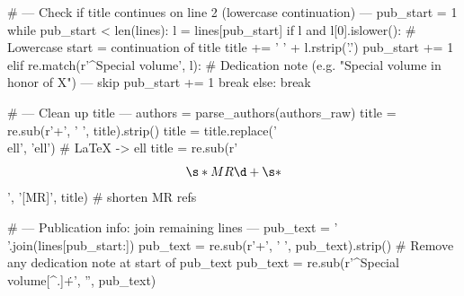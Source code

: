     # --- Check if title continues on line 2 (lowercase continuation) ---
    pub_start = 1
    while pub_start < len(lines):
        l = lines[pub_start]
        if l and l[0].islower():
            # Lowercase start = continuation of title
            title += ' ' + l.rstrip('.')
            pub_start += 1
        elif re.match(r'^Special volume', l):
            # Dedication note (e.g. "Special volume in honor of X") — skip
            pub_start += 1
            break
        else:
            break

    # --- Clean up title ---
    authors = parse_authors(authors_raw)
    title = re.sub(r'\s+', ' ', title).strip()
    title = title.replace('\\ell', 'ell')          # LaTeX \ell -> ell
    title = re.sub(r'\[\s*MR\d+\s*\]', '[MR]', title)  # shorten MR refs

    # --- Publication info: join remaining lines ---
    pub_text = ' '.join(lines[pub_start:])
    pub_text = re.sub(r'\s+', ' ', pub_text).strip()
    # Remove any dedication note at start of pub_text
    pub_text = re.sub(r'^Special volume[^.]+\.\s*', '', pub_text)

